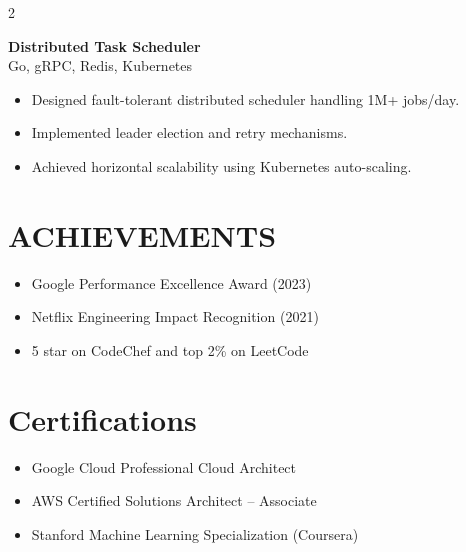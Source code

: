 \documentclass[11pt,a4paper]{article}
\newenvironment{resumelist}{
  \begin{itemize}[leftmargin=*,itemsep=2pt,topsep=1pt]
}{
  \end{itemize}
}
\begin{document}
\begin{paracol}{2}
\vspace{4pt}

\textbf{Distributed Task Scheduler} \\
Go, gRPC, Redis, Kubernetes

\begin{resumelist}
\item Designed fault-tolerant distributed scheduler handling 1M+ jobs/day.
\item Implemented leader election and retry mechanisms.
\item Achieved horizontal scalability using Kubernetes auto-scaling.
\end{resumelist}

\vspace{8pt}

\section*{ACHIEVEMENTS}

\begin{resumelist}
\item Google Performance Excellence Award (2023)
\item Netflix Engineering Impact Recognition (2021)
\item 5 star on CodeChef and top 2\% on LeetCode
\end{resumelist}

\vspace{8pt}

\section*{Certifications}

\begin{itemize}[leftmargin=*,itemsep=2pt]
\item Google Cloud Professional Cloud Architect
\item AWS Certified Solutions Architect – Associate
\item Stanford Machine Learning Specialization (Coursera)
\end{itemize}


\end{paracol}
\end{document}
